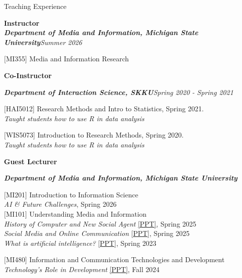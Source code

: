 \documentclass{resume} %
\begin{document}

\begin{rSection}{Teaching Experience}

{\bf Instructor}
\\\textit{\textbf{Department of Media and Information, Michigan State University}}\hfill {\em Summer 2026} 

[MI355] Media and Information Research


 
{\bf Co-Instructor}

\textbf{\textit{Department of Interaction Science, SKKU}}\hfill {\em Spring 2020 - Spring 2021} 
 
[HAI5012]
Research Methods and Intro to Statistics, Spring 2021. \\\textit{Taught students how to use R in data analysis}
 
[WIS5073]
Introduction to Research Methods, Spring 2020. \\\textit{Taught students how to use R in data analysis}


{\bf Guest Lecturer}

\textit{\textbf{Department of Media and Information, Michigan State University}}

[MI201] Introduction to Information Science\\
\textit{AI \& Future Challenges}, Spring 2026 
 \\
 
[MI101] Understanding Media and Information\\
\textit{History of Computer and New Social Agent} \href{https://drive.google.com/file/d/1spLfBQPSvXs74WWsKP1-uReVCRKhXnSQ/view?usp=drive_link}{[PPT]}, Spring 2025 
 \\
\textit{Social Media and Online Communication} \href{https://drive.google.com/file/d/1hnVzjzuJnGF6YDkSskQdkxj0ivl6CKjR/view?usp=drive_link}{[PPT]}, Spring 2025 \\
\textit{What is artificial intelligence?} \href{https://drive.google.com/file/d/1imtNCggrwK3l1UMPF9c5hOjqeHfOuXcs/view?usp=drive_link}{[PPT]}, Spring 2023 

[MI480]  Information and Communication Technologies and Development\\
\textit{Technology’s Role in Development} \href{https://drive.google.com/file/d/10BwKU8gbYhxP3ylJTA5A8C8PD0IBLoOn/view?usp=drive_link}{[PPT]}, Fall 2024 \\


\end{rSection}
\end{document}
